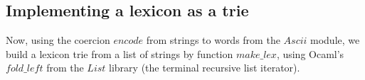 \subsection{Implementing a lexicon as a trie}

Now, using the coercion $encode$ from strings to words from the
$Ascii$ module, 
we build a lexicon trie from a list of strings by function $make\_lex$,
using Ocaml's $fold\_left$ from the $List$ library
(the terminal recursive list iterator). 

